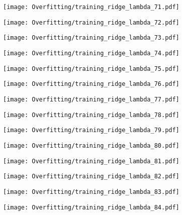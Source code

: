 \documentclass[xcolor=pdftex,dvipsnames,table]{beamer}
\begin{document}
\frame
{
	\begin{center}
		\texttt{[image: Overfitting/training\_ridge\_lambda\_71.pdf]}
	\end{center}
}
\frame
{
	\begin{center}
		\texttt{[image: Overfitting/training\_ridge\_lambda\_72.pdf]}
	\end{center}
}
\frame
{
	\begin{center}
		\texttt{[image: Overfitting/training\_ridge\_lambda\_73.pdf]}
	\end{center}
}
\frame
{
	\begin{center}
		\texttt{[image: Overfitting/training\_ridge\_lambda\_74.pdf]}
	\end{center}
}
\frame
{
	\begin{center}
		\texttt{[image: Overfitting/training\_ridge\_lambda\_75.pdf]}
	\end{center}
}
\frame
{
	\begin{center}
		\texttt{[image: Overfitting/training\_ridge\_lambda\_76.pdf]}
	\end{center}
}
\frame
{
	\begin{center}
		\texttt{[image: Overfitting/training\_ridge\_lambda\_77.pdf]}
	\end{center}
}
\frame
{
	\begin{center}
		\texttt{[image: Overfitting/training\_ridge\_lambda\_78.pdf]}
	\end{center}
}
\frame
{
	\begin{center}
		\texttt{[image: Overfitting/training\_ridge\_lambda\_79.pdf]}
	\end{center}
}
\frame
{
	\begin{center}
		\texttt{[image: Overfitting/training\_ridge\_lambda\_80.pdf]}
	\end{center}
}
\frame
{
	\begin{center}
		\texttt{[image: Overfitting/training\_ridge\_lambda\_81.pdf]}
	\end{center}
}
\frame
{
	\begin{center}
		\texttt{[image: Overfitting/training\_ridge\_lambda\_82.pdf]}
	\end{center}
}
\frame
{
	\begin{center}
		\texttt{[image: Overfitting/training\_ridge\_lambda\_83.pdf]}
	\end{center}
}
\frame
{
	\begin{center}
		\texttt{[image: Overfitting/training\_ridge\_lambda\_84.pdf]}
	\end{center}
}
\end{document}
